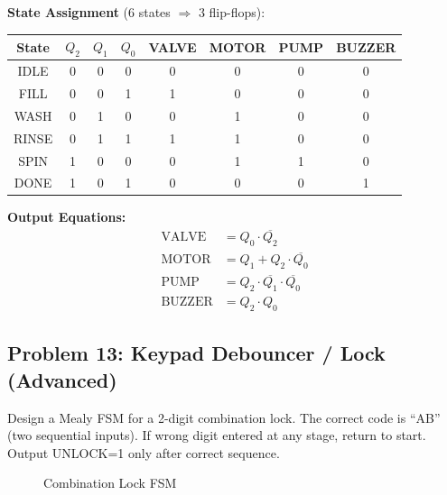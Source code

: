 \documentclass[12pt,a4paper]{article}
\begin{document}
\textbf{State Assignment} (6 states $\Rightarrow$ 3 flip-flops):

\begin{table}[H]
\centering
\begin{tabular}{c|ccc|cccc}
\toprule
State & $Q_2$ & $Q_1$ & $Q_0$ & VALVE & MOTOR & PUMP & BUZZER \\
\midrule
IDLE  & 0 & 0 & 0 & 0 & 0 & 0 & 0 \\
FILL  & 0 & 0 & 1 & 1 & 0 & 0 & 0 \\
WASH  & 0 & 1 & 0 & 0 & 1 & 0 & 0 \\
RINSE & 0 & 1 & 1 & 1 & 1 & 0 & 0 \\
SPIN  & 1 & 0 & 0 & 0 & 1 & 1 & 0 \\
DONE  & 1 & 0 & 1 & 0 & 0 & 0 & 1 \\
\bottomrule
\end{tabular}
\end{table}

\textbf{Output Equations:}
\begin{align}
\text{VALVE} &= Q_0 \cdot \overline{Q_2} \\
\text{MOTOR} &= Q_1 + Q_2\cdot\overline{Q_0} \\
\text{PUMP} &= Q_2 \cdot \overline{Q_1} \cdot \overline{Q_0} \\
\text{BUZZER} &= Q_2 \cdot Q_0
\end{align}


\subsection{Problem 13: Keypad Debouncer / Lock (Advanced)}

\begin{infobox}
Design a Mealy FSM for a 2-digit combination lock. The correct code is ``AB'' (two sequential inputs). If wrong digit entered at any stage, return to start. Output UNLOCK=1 only after correct sequence.
\end{infobox}

\begin{figure}[H]
\centering
{}
\caption{Combination Lock FSM}
\end{figure}
\end{document}
